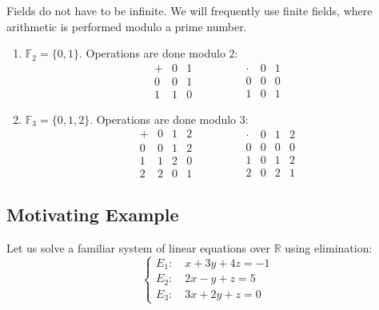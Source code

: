 \begin{example}
Fields do not have to be infinite. We will frequently use finite fields, where arithmetic is performed modulo a prime number. 
\begin{enumerate}
    \item $\mathbb{F}_2 = \{0, 1\}$. Operations are done modulo $2$:
    \[
    \begin{array}{c|cc}
    + & 0 & 1 \\
    \hline
    0 & 0 & 1 \\
    1 & 1 & 0
    \end{array}
    \qquad\qquad
    \begin{array}{c|cc}
    \cdot & 0 & 1 \\
    \hline
    0 & 0 & 0 \\
    1 & 0 & 1
    \end{array}
    \]
    \item $\mathbb{F}_3 = \{0, 1, 2\}$. Operations are done modulo $3$:
    \[
    \begin{array}{c|ccc}
    + & 0 & 1 & 2 \\
    \hline
    0 & 0 & 1 & 2 \\
    1 & 1 & 2 & 0 \\
    2 & 2 & 0 & 1
    \end{array}
    \qquad\qquad
    \begin{array}{c|ccc}
    \cdot & 0 & 1 & 2 \\
    \hline
    0 & 0 & 0 & 0 \\
    1 & 0 & 1 & 2 \\
    2 & 0 & 2 & 1
    \end{array}
    \]
\end{enumerate}
\end{example}

\subsection{Motivating Example}

Let us solve a familiar system of linear equations over $\mathbb{R}$ using elimination:
\begin{equation*}
\begin{cases}
E_1: \quad x + 3y + 4z = -1 \\
E_2: \quad 2x - y + z = 5 \\
E_3: \quad 3x + 2y + z = 0
\end{cases}
\end{equation*}

